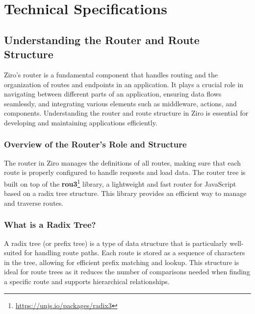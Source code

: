 \section{Technical Specifications} %


\subsection{Understanding the Router and Route Structure}

Ziro's router is a fundamental component that handles routing and the organization of routes and endpoints in an application. It plays a crucial role in navigating between different parts of an application, ensuring data flows seamlessly, and integrating various elements such as middleware, actions, and components. Understanding the router and route structure in Ziro is essential for developing and maintaining applications efficiently.

\subsubsection{Overview of the Router's Role and Structure}
The router in Ziro manages the definitions of all routes, making sure that each route is properly configured to handle requests and load data. The router tree is built on top of the \textbf{rou3}\footnote{\url{https://unjs.io/packages/radix3}} library, a lightweight and fast router for JavaScript based on a radix tree structure. This library provides an efficient way to manage and traverse routes.

\subsubsection{What is a Radix Tree?}
A radix tree (or prefix tree) is a type of data structure that is particularly well-suited for handling route paths. Each route is stored as a sequence of characters in the tree, allowing for efficient prefix matching and lookup. This structure is ideal for route trees as it reduces the number of comparisons needed when finding a specific route and supports hierarchical relationships.

